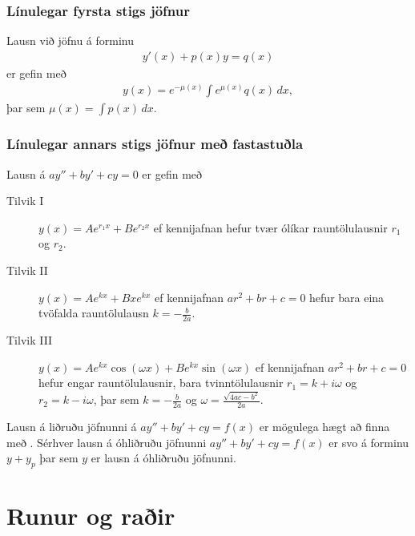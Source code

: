 \documentclass[b5paper,10pt,icelandic]{sphinxmanual}
\begin{document}
\subsection{Línulegar fyrsta stigs jöfnur}
\label{\detokenize{kafli08:linulegar-fyrsta-stigs-jofnur}}
Lausn við jöfnu á forminu
\begin{equation*}
\begin{split}y'(x) + p(x)y = q(x)\end{split}
\end{equation*}
er gefin með
\begin{equation*}
\begin{split}y(x) = e^{-\mu(x)} \int e^{\mu(x)} q(x)\, dx,\end{split}
\end{equation*}
þar sem \(\mu(x) = \int p(x)\, dx\).


\subsection{Línulegar annars stigs jöfnur með fastastuðla}
\label{\detokenize{kafli08:linulegar-annars-stigs-jofnur-me-fastastula}}
Lausn á \(ay''+by'+cy=0\) er gefin með
\begin{description}
\item[{Tilvik I}] \leavevmode
\(y(x)=Ae^{r_1x}+Be^{r_2x}\)
ef kennijafnan hefur tvær ólíkar rauntölulausnir \(r_1\) og
\(r_2\).

\item[{Tilvik II}] \leavevmode
\(y(x)=Ae^{kx}+Bxe^{kx}\)
ef kennijafnan \(ar^2+br+c=0\) hefur bara eina tvöfalda rauntölulausn
\(k=-\frac{b}{2a}\).

\item[{Tilvik III}] \leavevmode
\(y(x)=Ae^{kx}\cos(\omega x)+Be^{kx}\sin(\omega x)\)
ef kennijafnan \(ar^2+br+c=0\) hefur engar rauntölulausnir,
bara tvinntölulausnir \(r_1=k+i\omega\) og
\(r_2=k-i\omega\), þar sem
\(k=-\frac{b}{2a}\) og \(\omega=\frac{\sqrt{4ac-b^2}}{2a}\).

\end{description}

Lausn á liðruðu jöfnunni  á \(ay''+by'+cy=f(x)\) er mögulega hægt að finna
með {\hyperref[\detokenize{kafli08:agiskun}]{}}. Sérhver lausn á óhliðruðu jöfnunni \(ay''+by'+cy=f(x)\)
er svo á forminu \(y+y_p\) þar sem \(y\) er
lausn á óhliðruðu jöfnunni.


\chapter{Runur og raðir}
\label{\detokenize{kafli09:runur-og-rair}}\label{\detokenize{kafli09::doc}}
\end{document}

